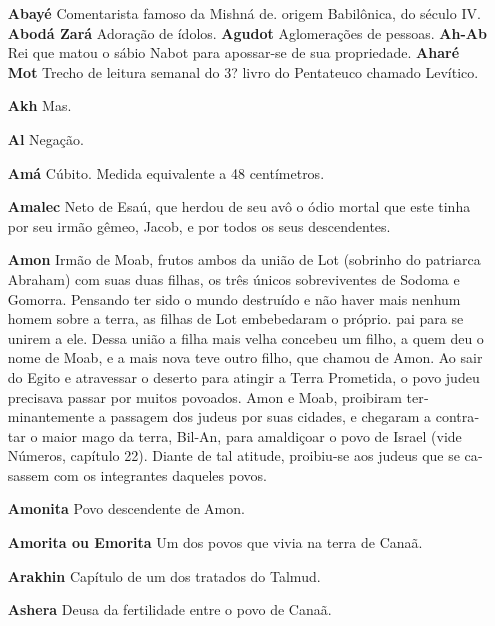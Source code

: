   \begingroup\footnotesize
\begin{itemize}

\item[\textbf{Abayé}] Comentarista famoso da Mish­ná de. origem Babilônica,
do século IV. \textbf{Abodá Zará} Adoração de ídolos. \textbf{Agudot} 
Aglomerações de pessoas. \textbf{Ah-Ab} Rei que matou o sábio Nabot
para apossar-se de sua propriedade. \textbf{Aharé Mot} Trecho de
leitura sema­nal do 3? livro do Pentateuco chama­do Levítico.

\item[\textbf{Akh}] Mas.

\item[\textbf{Al}] Negação.

\item[\textbf{Amá}] Cúbito. Medida equivalente a 48 centímetros.

\item[\textbf{Amalec}] Neto de Esaú, que herdou de seu avô o ódio mortal que
este tinha por seu irmão gêmeo, Jacob, e por to­dos os seus
descendentes.

\item[\textbf{Amon}] Irmão de Moab, frutos ambos da união de Lot (sobrinho do
patriar­ca Abraham) com suas duas filhas, os três únicos sobreviventes
de Sodoma e Gomorra. Pensando ter sido o mun­do destruído e não haver
mais nenhum homem sobre a terra, as filhas de Lot embebedaram o próprio.
pai para se unirem a ele. Dessa união a filha mais
velha concebeu um filho, a quem deu o nome de Moab, e a mais nova teve
outro filho, que chamou de Amon. Ao sair do Egito e atravessar o deserto
pa­ra atingir a Terra Prometida, o povo ju­deu precisava passar por
muitos po­voados. Amon e Moab, proibiram ter­minantemente a passagem dos
judeus por suas cidades, e chegaram a contra­tar o maior mago da terra,
Bil-An, para amaldiçoar o povo de Israel (vide Nú­meros, capítulo 22).
Diante de tal ati­tude, proibiu-se aos judeus que se ca­sassem com os
integrantes daqueles povos.

\item[\textbf{Amonita}] Povo descendente de Amon.

\item[\textbf{Amorita ou Emorita}] Um dos povos que vivia na terra de Canaã.

\item[\textbf{Arakhin}] Capítulo de um dos tratados do Talmud.

\item[\textbf{Ashera}] Deusa da fertilidade entre o povo de Canaã.


\end{itemize}
